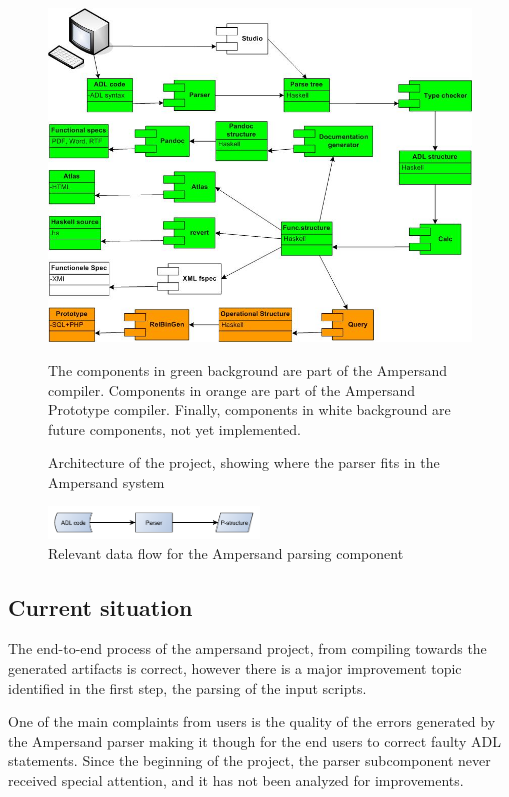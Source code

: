 %
\begin{figure}[htb]
	\centering
	\includegraphics[width=\textwidth]{Figures/ADL_systeemarchitectuur}
	\caption[Architecture of the project]{Architecture of the project, showing where the parser fits in the Ampersand system}
	\label{fig:architecture}
	\small
	The components in green background are part of the Ampersand compiler.
	Components in orange are part of the Ampersand Prototype compiler.
	Finally, components in white background are future components, not yet implemented.
\end{figure}
%
\begin{figure}[htb]
	\centering
	\includegraphics[width=0.5\textwidth]{Figures/Architecture}
	\caption{Relevant data flow for the Ampersand parsing component}
	\label{fig:data-flow}
\end{figure}

\subsection{Current situation}
The end-to-end process of the ampersand project, from compiling towards the generated artifacts is correct, however there is a major improvement topic identified in the first step, the parsing of the input scripts.

One of the main complaints from users is the quality of the errors generated by the Ampersand parser making it though for the end users to correct faulty ADL statements.
Since the beginning of the project, the parser subcomponent never received special attention, and it has not been analyzed for improvements.

